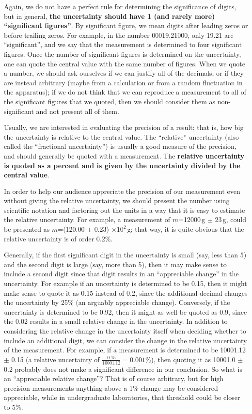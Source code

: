 Again, we do not have a perfect rule for determining the significance of digits, but in general, \textbf{the uncertainty should have 1 (and rarely more) ``significant figures''}. By significant figure, we mean digits after leading zeros or before trailing zeros. For example, in the number 00019.21000, only 19.21 are ``significant'', and we say that the measurement is determined to four significant figures. Once the number of significant figures is determined on the uncertainty, one can quote the central value with the same number of figures. When we quote a number, we should ask ourselves if we can justify all of the decimals, or if they are instead arbitrary (maybe from a calculation or from a random fluctuation in the apparatus); if we do not think that we can reproduce a measurement to all of the significant figures that we quoted, then we should consider them as non-significant and not present all of them.

Usually, we are interested in evaluating the precision of a result; that is, how big the uncertainty is relative to the central value. The ``relative'' uncertainty (also called the ``fractional uncertainty'') is usually a good measure of the precision, and should generally be quoted with a measurement. The \textbf{relative uncertainty is quoted as a percent and is given by the uncertainty divided by the central value}.

In order to help our audience appreciate the precision of our measurement even without giving the relative uncertainty, we should present the number using scientific notation and factoring out the units in a way that it is easy to estimate the relative uncertainty. For example, a measurement of $m$=12000\,g $\pm$ 23\,g, could be presented as $m$=(120.00 $\pm$ 0.23) $\times 10^2$\,g; that way, it is quite obvious that the relative uncertainty is of order 0.2\%.

Generally, if the first significant digit in the uncertainty is small (say, less than 5) and the second digit is large (say, more than 5), then it may make sense to include a second digit since that digit results in an ``appreciable change'' in the uncertainty. For example if an uncertainty is determined to be 0.15, then it might make sense to quote it as 0.15 instead of 0.2, since the additional decimal changes the uncertainty by 25\% (an arguably appreciable change). Conversely, if the uncertainty is determined to be 0.92, then it might as well be quoted as 0.9, since the 0.02 results in a small relative change in the uncertainty. In addition to considering the relative change in the uncertainty itself when deciding whether to include an additional digit, we can consider the change in the relative uncertainty of the measurement. For example, if a measurement is determined to be 10001.12 $\pm$ 0.15 (a relative uncertainty of $\frac{0.15}{10001.12}=0.001\%$), then quoting it as 10001.0 $\pm$ 0.2 probably does not make a significant difference in our conclusion. So what is an ``appreciable relative change''? That is of course arbitrary, but for high precision measurements anything above a 1\% change may be considered appreciable, while in undergraduate laboratories, that threshold could be closer to 5\%. 

